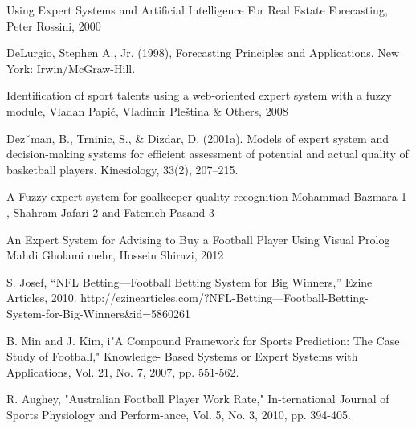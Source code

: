 \documentclass[runningheads,a4paper]{llncs}
\begin{document}
\begin{thebibliography}{7}

   Using Expert Systems and Artificial Intelligence For Real
    Estate Forecasting, Peter Rossini, 2000

   DeLurgio, Stephen A., Jr. (1998), Forecasting Principles and
    Applications. New York: Irwin/McGraw-Hill. 

   Identification of  sport talents using a web-oriented
    expert  system  with  a fuzzy module, Vladan  Papić, Vladimir Pleština \&
    Others, 2008

   Dezˇman, B., Trninic, S., \& Dizdar, D. (2001a). Models
    of expert system and decision-making systems for efficient assessment of
    potential and actual quality of basketball players. Kinesiology, 33(2),
    207–215.

   A Fuzzy expert system for goalkeeper quality recognition
    Mohammad Bazmara 1 , Shahram Jafari 2 and Fatemeh Pasand 3

   An Expert System for Advising to Buy a Football
  Player Using Visual Prolog
  Mahdi Gholami mehr, Hossein Shirazi, 2012

   S. Josef, “NFL Betting—Football Betting System for Big
    Winners,” Ezine Articles, 2010.
    http://ezinearticles.com/?NFL-Betting---Football-Betting-
    System-for-Big-Winners\&id=5860261

   B. Min and J. Kim, i"A Compound Framework for Sports
    Prediction: The Case Study of Football," Knowledge-
    Based Systems or Expert Systems with Applications, Vol.
    21, No. 7, 2007, pp. 551-562.

   R. Aughey, "Australian Football Player Work Rate,"
    In-ternational Journal of Sports Physiology and Perform-ance, Vol. 5, No.
    3, 2010, pp. 394-405.

\end{thebibliography}

\appendix
\end{document}
